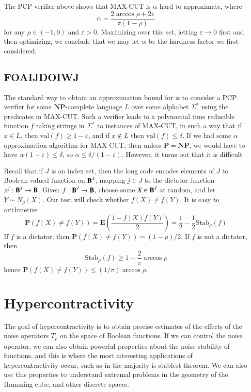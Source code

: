 The PCP verifier above shows that MAX-CUT is $\alpha$ hard to approximate, where
%
\[ \alpha = \frac{2 \arccos \rho + 2\varepsilon}{\pi(1 - \rho)} \]
%
for any $\rho \in (-1,0)$ and $\varepsilon > 0$. Maximizing over this set, letting $\varepsilon \to 0$ first and then optimizing, we conclude that we may let $\alpha$ be the hardness factor we first considered.


\section{FOAIJDOIWJ}

The standard way to obtain an approximation bound for is to consider a PCP verifier for some $\mathbf{NP}$-complete language $L$ over some alphabet $\Sigma^*$ using the predicates in MAX-CUT. Such a verifier leads to a polynomial time reducible function $f$ taking strings in $\Sigma^*$ to instances of MAX-CUT, in such a way that if $x \in L$, then $\text{val}(f) \geq 1 - \varepsilon$, and if $x \not \in L$ then $\text{val}(f) \leq \delta$. If we had some $\alpha$ approximation algorithm for MAX-CUT, then unless $\mathbf{P} = \mathbf{NP}$, we would have to have $\alpha (1 - \varepsilon) \leq \delta$, so $\alpha \leq \delta/(1-\varepsilon)$. However, it turns out that it is difficult

Recall that if $J$ is an index set, then the long code encodes elements of $J$ to Boolean valued function on $\operatorname{\mathbf{B}}^J$, mapping $j \in J$ to the dictator function $x^j: \operatorname{\mathbf{B}}^J \to \operatorname{\mathbf{B}}$. Given $f: \operatorname{\mathbf{B}}^J \to \operatorname{\mathbf{B}}$, choose some $X \in \operatorname{\mathbf{B}}^J$ at random, and let $Y \sim N_{\rho}(X)$. Our test will check whether $f(X) \neq f(Y)$. It is easy to arithmetize
%
\[ \mathbf{P}(f(X) \neq f(Y)) = \mathbf{E} \left( \frac{1 - f(X)f(Y)}{2} \right) = \frac{1}{2} - \frac{1}{2} \text{Stab}_\rho(f) \]
%
If $f$ is a dictator, then $\mathbf{P}(f(X) \neq f(Y)) = (1 - \rho)/2$. If $f$ is not a dictator, then
%
\[ \text{Stab}_\rho(f) \geq 1 - \frac{2}{\pi} \arccos \rho \]
%
hence $\mathbf{P}(f(X) \neq f(Y)) \leq (1/\pi) \arccos \rho$.






\chapter{Hypercontractivity}

The goal of hypercontractivity is to obtain precise estimates of the effects of the noise operators $T_\rho$ on the space of Boolean functions. If we can control the noise operator, we can also obtain powerful properties about the noise stability of functions, and this is where the most interesting applications of hypercontractivity occur, such as in the majority is stablest theorem. We can also use this properties to understand extremal problems in the geometry of the Hamming cube, and other discrete spaces.

